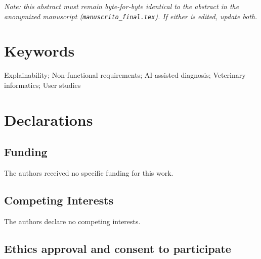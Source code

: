 \documentclass[12pt]{article}
\begin{document}
\textit{Note: this abstract must remain byte-for-byte identical to the abstract in the anonymized manuscript (\texttt{manuscrito\_final.tex}). If either is edited, update both.}


\section*{Keywords}

Explainability; Non-functional requirements; AI-assisted diagnosis;
Veterinary informatics; User studies

\vspace{1.5em}


\section*{Declarations}


\subsection*{Funding}

The authors received no specific funding for this work.


\subsection*{Competing Interests}

The authors declare no competing interests.


\subsection*{Ethics approval and consent to participate}
\end{document}
